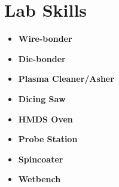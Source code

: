 \documentclass[]{chandan-cv}
\begin{document}
\hfill
\begin{minipage}[t]{0.20\textwidth}


\section{Lab Skills}
	\begin{itemize}
		\setlength\itemsep{-0.2em}
		\item \textbf{Wire-bonder}
		\item \textbf{Die-bonder}
		\item \textbf{Plasma Cleaner/Asher}
		\item \textbf{Dicing Saw}
		\item \textbf{HMDS Oven}
		\item \textbf{Probe Station}
		\item \textbf{Spincoater}
		\item \textbf{Wetbench}
	\end{itemize}
\end{minipage}

%
%
\end{document}
